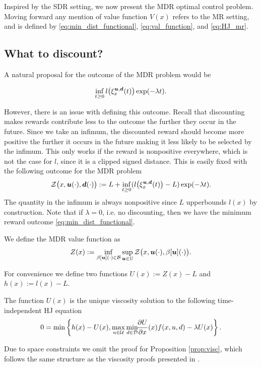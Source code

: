 Inspired by the SDR setting, we now present the MDR optimal control problem. Moving forward any mention of value function $V(x)$ refers to the MR setting, and is defined by \eqref{eq:min_dist_functional}, \eqref{eq:val_function}, and \eqref{eq:HJ_mr}.

\subsection{What to discount?}

A natural proposal for the outcome of the MDR problem would be
 
\begin{equation}
\inf_{t\ge 0}l\big(\xi_{x}^{\bm{u},\bm{d}}(t)\big)\exp(-\lambda  t).
\end{equation}

However, there is an issue with defining this outcome. Recall that discounting makes rewards contribute less to the outcome the further they occur in the future. Since we take an infimum, the discounted reward should become more positive the further it occurs in the future making it less likely to be selected by the infimum. This only works if the reward is nonpositive everywhere, which is not the case for $l$, since it is a clipped signed distance. This is easily fixed with the following outcome for the MDR problem
%
\begin{equation}
\mathcal{Z}\big(x,\bm{u}(\cdot),\bm{d}(\cdot)\big) := L + \inf_{t\ge 0}(l\big(\xi_{x}^{\bm{u},\bm{d}}(t)\big)-L)\exp(-\lambda  t).
\end{equation}%
\noindent The quantity in the infimum is always nonpositive since $L$ upperbounds $l(x)$ by construction. Note that if ${\lambda=0}$, i.e. no discounting, then we have the minimum reward outcome \eqref{eq:min_dist_functional}. 

We define the MDR value function as
%
\begin{equation} \label{eq:mdr_val_function}
Z(x):=\inf_{\beta[\bm{u}](\cdot) \in \mathcal{B}} \sup_{\bm{u} \in \mathbb{U}}\mathcal{Z}\big(x,\bm{u}(\cdot),\beta[\bm{u}](\cdot)\big).
\end{equation}

For convenience we define two functions ${U(x):=Z(x)-L}$ and ${h(x):=l(x)-L}$. 
%
\begin{proposition}\label{prop:visc}
The function $U(x)$ is the unique viscosity solution to the following time-independent HJ equation
\begin{equation} \label{eq:HJ_mdr}
    0 = \min \left\{h(x)-U(x), \max_{u\in\mathcal{U}} \min_{ d\in\mathcal{D}} \!\!\frac{\partial U}{\partial x}(x) f(x,u, d) - \lambda U(x)\right\}.
\end{equation}
\end{proposition}%
\noindent Due to space constraints we omit the proof for Proposition \ref{prop:visc}, which follows the same structure as the viscosity proofs presented in \cite{Evans1984}. 

